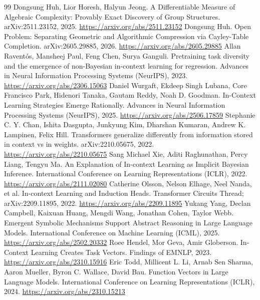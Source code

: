 \documentclass[11pt]{article}
\begin{document}
\begin{thebibliography}{99}
 Dongsung Huh, Lior Horesh, Halyun Jeong. \newblock A Differentiable Measure of Algebraic Complexity: Provably Exact Discovery of Group Structures. \newblock arXiv:2511.23152, 2025. \newblock \url{https://arxiv.org/abs/2511.23152}
 Dongsung Huh. \newblock Open Problem: Separating Geometric and Algorithmic Compression via Cayley-Table Completion. \newblock arXiv:2605.29885, 2026. \newblock \url{https://arxiv.org/abs/2605.29885}
 Allan Ravent\'os, Mansheej Paul, Feng Chen, Surya Ganguli. \newblock Pretraining task diversity and the emergence of non-Bayesian in-context learning for regression. \newblock Advances in Neural Information Processing Systems (NeurIPS), 2023. \newblock \url{https://arxiv.org/abs/2306.15063}
 Daniel Wurgaft, Ekdeep Singh Lubana, Core Francisco Park, Hidenori Tanaka, Gautam Reddy, Noah D. Goodman. \newblock In-Context Learning Strategies Emerge Rationally. \newblock Advances in Neural Information Processing Systems (NeurIPS), 2025. \newblock \url{https://arxiv.org/abs/2506.17859}
 Stephanie C. Y. Chan, Ishita Dasgupta, Junkyung Kim, Dharshan Kumaran, Andrew K. Lampinen, Felix Hill. \newblock Transformers generalize differently from information stored in context vs in weights. \newblock arXiv:2210.05675, 2022. \newblock \url{https://arxiv.org/abs/2210.05675}
 Sang Michael Xie, Aditi Raghunathan, Percy Liang, Tengyu Ma. \newblock An Explanation of In-context Learning as Implicit Bayesian Inference. \newblock International Conference on Learning Representations (ICLR), 2022. \newblock \url{https://arxiv.org/abs/2111.02080}
 Catherine Olsson, Nelson Elhage, Neel Nanda, et al. \newblock In-context Learning and Induction Heads. \newblock Transformer Circuits Thread; arXiv:2209.11895, 2022. \newblock \url{https://arxiv.org/abs/2209.11895}
 Yukang Yang, Declan Campbell, Kaixuan Huang, Mengdi Wang, Jonathan Cohen, Taylor Webb. \newblock Emergent Symbolic Mechanisms Support Abstract Reasoning in Large Language Models. \newblock International Conference on Machine Learning (ICML), 2025. \newblock \url{https://arxiv.org/abs/2502.20332}
 Roee Hendel, Mor Geva, Amir Globerson. \newblock In-Context Learning Creates Task Vectors. \newblock Findings of EMNLP, 2023. \newblock \url{https://arxiv.org/abs/2310.15916}
 Eric Todd, Millicent L. Li, Arnab Sen Sharma, Aaron Mueller, Byron C. Wallace, David Bau. \newblock Function Vectors in Large Language Models. \newblock International Conference on Learning Representations (ICLR), 2024. \newblock \url{https://arxiv.org/abs/2310.15213}

\end{thebibliography}
\end{document}
